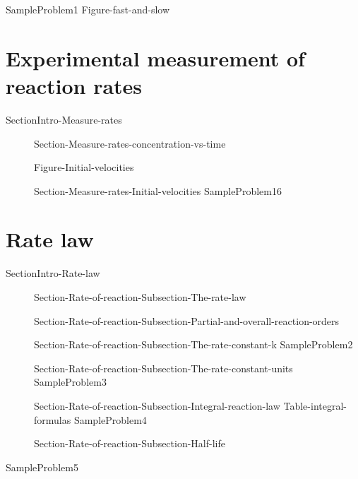\documentclass[main.tex]{subfiles}
\begin{document}
  {SampleProblem1}
  {Figure-fast-and-slow}


\section{Experimental measurement of reaction rates}{SectionIntro-Measure-rates}
\sloppy\begin{description}
\item[] {Section-Measure-rates-concentration-vs-time}
\begin{center}{Figure-Initial-velocities}\end{center}
\item[] {Section-Measure-rates-Initial-velocities}
{SampleProblem16}
 \end{description}



\section{Rate law}{SectionIntro-Rate-law}
 \sloppy \begin{description}
\item[] {Section-Rate-of-reaction-Subsection-The-rate-law}
\item[] {Section-Rate-of-reaction-Subsection-Partial-and-overall-reaction-orders}
\item[] {Section-Rate-of-reaction-Subsection-The-rate-constant-k}
{SampleProblem2}
\item[] {Section-Rate-of-reaction-Subsection-The-rate-constant-units}
{SampleProblem3}
\item[] {Section-Rate-of-reaction-Subsection-Integral-reaction-law}
{Table-integral-formulas}
{SampleProblem4}
\item[]  {Section-Rate-of-reaction-Subsection-Half-life}
\end{description}
{SampleProblem5}
\end{document}
